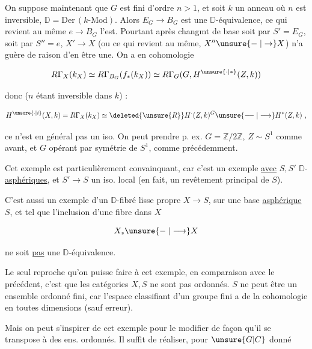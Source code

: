 \unsure{\S}

On suppose maintenant que $G$ est fini d'ordre $n>1$, et soit $k$ un anneau où $n$ est inversible,  $\mathbb D=\mathrm{Der}\,(k\text{-}\mathrm{Mod})$. Alors $E_G\to B_G$ est une $\mathbb D$-équivalence,  ce  qui revient au même $e\to B_G$ \unsure{:} l'est. Pourtant après changmt de base soit par $S'=E_G$, soit par $S''=e$,  $X'\to X$ (ou ce qui revient au même, $X''\unsure{\relbar|\to} X$) n'a  guère de raison d'en être une. On a en cohomologie


\[
R\Gamma_X(k_X)\simeq R\Gamma_{B_G}(f_*(k_X))\simeq R\Gamma_G(G,H^{\unsure{\cdot|*}}(Z,k))
\]


donc ($n$ étant inversible dans $k$) :

\[
H^{\unsure{\cdot|i}}(X,k)=R\Gamma_X(k_X)\simeq\deleted{\unsure{R}}H^{\cdot}(Z,k)^G\unsure{\relbar\joinrel\relbar|\longrightarrow}H^*(Z,k)\ ,
\]

ce n'est en général pas un iso. On peut prendre p. ex. $G=\mathbb Z/2\mathbb Z$, $Z\sim S^1$ comme avant, et $G$ opérant par symétrie de $S^1$, comme précédemment.

Cet exemple est particulièrement convainquant, car c'est un exemple \uline{avec} $S,S'$ $\mathbb D$-\uline{asphériques}, et $S'\to S$ un iso. local (en fait, un revêtement principal de $S$).

C'est aussi un exemple d'un $\mathbb D$-fibré lisse  propre $X\to S$, sur une base \uline{asphérique} $S$, et tel que l'inclusion d'une fibre dans $X$

\[
X_s\unsure{\relbar|\longrightarrow}X
\]

ne soit \uline{pas} une $\mathbb D$-équivalence.

Le seul reproche qu'on puisse faire à cet exemple, en comparaison avec le précédent, c'est que les catégories $X,S$ ne sont pas  ordonnés.  $S$ ne peut être un ensemble ordonné fini, car l'espace classifiant d'un groupe fini a de la cohomologie en toutes dimensions (sauf erreur).


Mais on peut s'inspirer de cet exemple pour le modifier de façon qu'il se transpose à des ens. ordonnés. Il suffit de réaliser, pour $\unsure{G|C}$ donné

